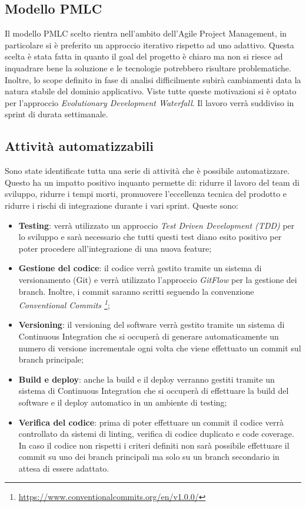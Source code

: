 \documentclass{article}
\begin{document}
  \subsection{Modello PMLC}

  Il modello PMLC scelto rientra nell'ambito dell'Agile Project Management, in particolare si è preferito un  
    approccio iterativo rispetto ad uno adattivo. Questa scelta è stata fatta in quanto il goal del progetto
    è chiaro ma non si riesce ad inquadrare bene la soluzione e le tecnologie potrebbero risultare problematiche.
    Inoltre, lo scope definito in fase di analisi difficilmente subirà cambiamenti data la natura stabile 
    del dominio applicativo. Viste tutte queste motivazioni si è optato per l'approccio
    \emph{Evolutionary Development Waterfall}.
    Il lavoro verrà suddiviso in sprint di durata settimanale.

  \subsection{Attività automatizzabili}

  Sono state identificate tutta una serie di attività che è possibile automatizzare. Questo ha un impatto positivo
  inquanto permette di: ridurre il lavoro del team di sviluppo, ridurre i tempi morti, promuovere l'eccellenza
  tecnica del prodotto e ridurre i rischi di integrazione durante i vari sprint. Queste sono:
  
  \begin{itemize}
    \item \textbf{Testing}: verrà utilizzato un approccio \emph{Test Driven Development (TDD)} per lo sviluppo e
      sarà necessario che tutti questi test diano esito positivo per poter procedere all'integrazione di una nuova
      feature;
    \item \textbf{Gestione del codice}: il codice verrà gestito tramite un sistema di versionamento (Git) e verrà
      utilizzato l'approccio \emph{GitFlow} per la gestione dei branch. Inoltre, i commit saranno scritti seguendo
      la convenzione \emph{Conventional Commits \footnote{\url{https://www.conventionalcommits.org/en/v1.0.0/}}};
    \item \textbf{Versioning}: il versioning del software verrà gestito tramite un sistema di Continuous Integration
      che si occuperà di generare automaticamente un numero di versione incrementale ogni volta che viene 
      effettuato un commit sul branch principale; 
    \item \textbf{Build e deploy}: anche la build e il deploy verranno gestiti tramite un sistema di Continuous 
      Integration che si occuperà di effettuare la build del software e il deploy automatico in un ambiente di testing;
    \item \textbf{Verifica del codice}: prima di poter effettuare un commit il codice verrà controllato da sistemi di 
      linting, verifica di codice duplicato e code coverage. In caso il codice non rispetti i criteri definiti non sarà 
      possibile effettuare il commit su uno dei branch principali ma solo su un branch secondario in attesa di essere
      adattato.
  \end{itemize}
\end{document}
